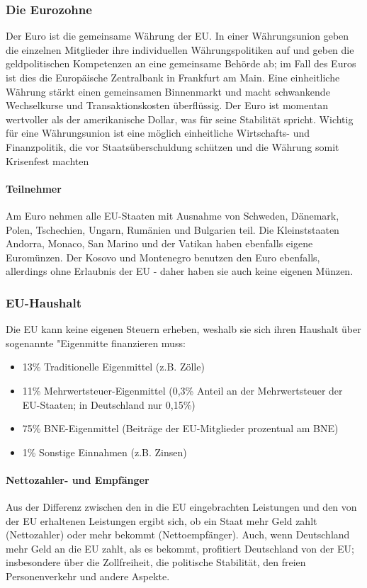 \documentclass{article}
\begin{document}
	\subsubsection{Die Eurozohne}
	Der Euro ist die gemeinsame Währung der EU. In einer Währungsunion geben die einzelnen Mitglieder ihre individuellen Währungspolitiken auf und geben die geldpolitischen Kompetenzen an eine gemeinsame Behörde ab; im Fall des Euros ist dies die Europäische Zentralbank in Frankfurt am Main. Eine einheitliche Währung stärkt einen gemeinsamen Binnenmarkt und macht schwankende Wechselkurse und Transaktionskosten überflüssig. Der Euro ist momentan wertvoller als der amerikanische Dollar, was für seine Stabilität spricht. Wichtig für eine Währungsunion ist eine möglich einheitliche Wirtschafts- und Finanzpolitik, die vor Staatsüberschuldung schützen und die Währung somit Krisenfest machten

	\paragraph{Teilnehmer}
	Am Euro nehmen alle EU-Staaten mit Ausnahme von Schweden, Dänemark, Polen, Tschechien, Ungarn, Rumänien und Bulgarien teil. Die Kleinststaaten Andorra, Monaco, San Marino und der Vatikan haben ebenfalls eigene Euromünzen. Der Kosovo und Montenegro benutzen den Euro ebenfalls, allerdings ohne Erlaubnis der EU - daher haben sie auch keine eigenen Münzen.

	\subsubsection{EU-Haushalt}
	Die EU kann keine eigenen Steuern erheben, weshalb sie sich ihren Haushalt über sogenannte "Eigenmitte  finanzieren muss:

 	\begin{itemize}
		\item 13\% Traditionelle Eigenmittel (z.B. Zölle)
		\item 11\% Mehrwertsteuer-Eigenmittel (0,3\% Anteil an der Mehrwertsteuer der EU-Staaten; in Deutschland nur 0,15\%)
		\item 75\% BNE-Eigenmittel (Beiträge der EU-Mitglieder prozentual am BNE)
		\item 1\% Sonstige Einnahmen (z.B. Zinsen)
	\end{itemize}

	\paragraph{Nettozahler- und Empfänger}
	Aus der Differenz zwischen den in die EU eingebrachten Leistungen und den von der EU erhaltenen Leistungen ergibt sich, ob ein Staat mehr Geld zahlt (Nettozahler) oder mehr bekommt (Nettoempfänger). Auch, wenn Deutschland mehr Geld an die EU zahlt, als es bekommt, profitiert Deutschland von der EU; insbesondere über die Zollfreiheit, die politische Stabilität, den freien Personenverkehr und andere Aspekte.
\end{document}
